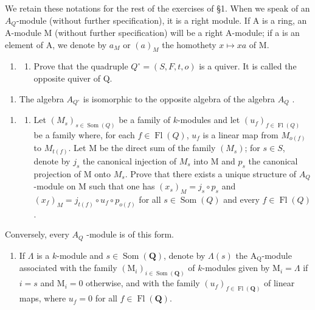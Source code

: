 We retain these notations for the rest of the exercises of §1. When we speak of an \(A_{Q}\)-module (without further specification), it is a right module. If A is a ring, an A-module M (without further specification) will be a right A-module; if a is an element of A, we denote by \(a_{M}\) or \((a)_{M}\) the homothety \(x \mapsto xa\) of M.

\begin{enumerate}
\def\labelenumi{\arabic{enumi})}
\setcounter{enumi}{4}
\tightlist
\item
  \begin{enumerate}
  \def\labelenumii{\alph{enumii})}
  \tightlist
  \item
    Prove that the quadruple \(Q^{\circ} = (S, F, t, o)\) is a quiver. It is called the opposite quiver of Q.
  \end{enumerate}
\end{enumerate}

\begin{enumerate}
\def\labelenumi{\alph{enumi})}
\setcounter{enumi}{1}
\tightlist
\item
  The algebra \(A_{Q^{\circ}}\) is isomorphic to the opposite algebra of the algebra \(A_{Q}\) .
\end{enumerate}

\begin{enumerate}
\def\labelenumi{\arabic{enumi})}
\setcounter{enumi}{5}
\tightlist
\item
  \begin{enumerate}
  \def\labelenumii{\alph{enumii})}
  \tightlist
  \item
    Let \((M_s)_{s\in\operatorname{Som}(Q)}\) be a family of \(k\)-modules and let \((u_f)_{f\in\operatorname{Fl}(Q)}\) be a family where, for each \(f\in\operatorname{Fl}(Q)\), \(u_f\) is a linear map from \(M_{o(f)}\) to \(M_{t(f)}\). Let M be the direct sum of the family \((M_s)\); for \(s\in S\), denote by \(j_s\) the canonical injection of \(M_s\) into M and \(p_s\) the canonical projection of M onto \(M_s\). Prove that there exists a unique structure of \(A_Q\)-module on M such that one has \((x_s)_M = j_s \circ p_s\) and \((x_f)_M = j_{t(f)} \circ u_f \circ p_{o(f)}\) for all \(s \in \operatorname{Som}(Q)\) and every \(f \in \operatorname{Fl}(Q)\).
  \end{enumerate}
\end{enumerate}

Conversely, every \(A_{Q}\) -module is of this form.

\begin{enumerate}
\def\labelenumi{\alph{enumi})}
\setcounter{enumi}{1}
\tightlist
\item
  If \(\Lambda\) is a \(k\)-module and \(s \in \operatorname{Som}(\mathbf{Q})\), denote by \(\Lambda(s)\) the \(\mathrm{A}_{\mathrm{Q}}\)-module associated with the family \((\mathrm{M}_i)_{i \in \operatorname{Som}(\mathbf{Q})}\) of \(k\)-modules given by \(\mathrm{M}_i = \Lambda\) if \(i = s\) and \(\mathrm{M}_i = 0\) otherwise, and with the family \((u_f)_{f \in \operatorname{Fl}(\mathbf{Q})}\) of linear maps, where \(u_f = 0\) for all \(f \in \operatorname{Fl}(\mathbf{Q})\).
\end{enumerate}

